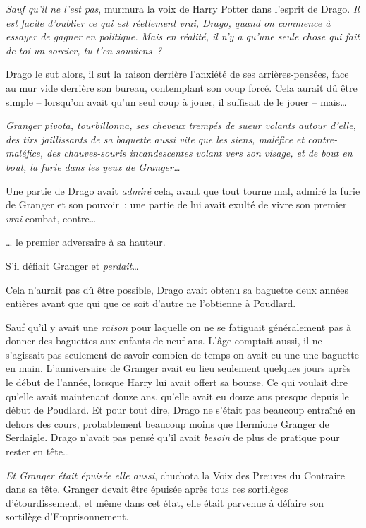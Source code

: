 \emph{Sauf qu'il ne l'est pas}, murmura la voix de Harry Potter dans l'esprit de Drago. \emph{Il est facile d'oublier ce qui est réellement vrai, Drago, quand on commence à essayer de gagner en politique. Mais en réalité, il n'y a qu'une seule chose qui fait de toi un sorcier, tu t'en souviens~?}

Drago le sut alors, il sut la raison derrière l'anxiété de ses arrières-pensées, face au mur vide derrière son bureau, contemplant son coup forcé. Cela aurait dû être simple -- lorsqu'on avait qu'un seul coup à jouer, il suffisait de le jouer -- mais…

\emph{Granger pivota, tourbillonna, ses cheveux trempés de sueur volants autour d'elle, des tirs jaillissants de sa baguette aussi vite que les siens, maléfice et contre-maléfice, des chauves-souris incandescentes volant vers son visage, et de bout en bout, la furie dans les yeux de Granger…}

Une partie de Drago avait \emph{admiré} cela, avant que tout tourne mal, admiré la furie de Granger et son pouvoir~; une partie de lui avait exulté de vivre son premier \emph{vrai} combat, contre…

… le premier adversaire à sa hauteur.

S'il défiait Granger et \emph{perdait}…

Cela n'aurait pas dû être possible, Drago avait obtenu sa baguette deux années entières avant que qui que ce soit d'autre ne l'obtienne à Poudlard.

Sauf qu'il y avait une \emph{raison} pour laquelle on ne se fatiguait généralement pas à donner des baguettes aux enfants de neuf ans. L'âge comptait aussi, il ne s'agissait pas seulement de savoir combien de temps on avait eu une une baguette en main. L'anniversaire de Granger avait eu lieu seulement quelques jours après le début de l'année, lorsque Harry lui avait offert sa bourse. Ce qui voulait dire qu'elle avait maintenant douze ans, qu'elle avait eu douze ans presque depuis le début de Poudlard. Et pour tout dire, Drago ne s'était pas beaucoup entraîné en dehors des cours, probablement beaucoup moins que Hermione Granger de Serdaigle. Drago n'avait pas pensé qu'il avait \emph{besoin} de plus de pratique pour rester en tête…

\emph{Et Granger était épuisée elle aussi}, chuchota la Voix des Preuves du Contraire dans sa tête. Granger devait être épuisée après tous ces sortilèges d'étourdissement, et même dans cet état, elle était parvenue à défaire son sortilège d'Emprisonnement.

